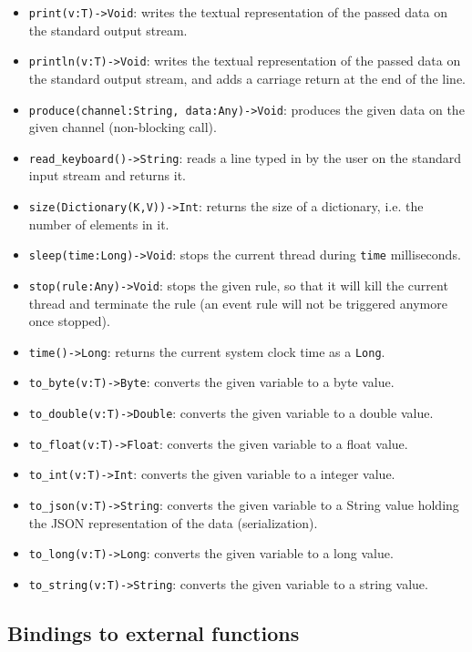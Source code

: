 \documentclass[11pt]{report}
\begin{document}
\begin{itemize}
\item \texttt{print(v:T)->Void}: writes the textual representation of the passed data on the standard output stream.
\item \texttt{println(v:T)->Void}: writes the textual representation of the passed data on the standard output stream, and adds a carriage return at the end of the line.
\item \texttt{produce(channel:String, data:Any)->Void}: produces the given data on the given channel (non-blocking call).
\item \texttt{read\_keyboard()->String}: reads a line typed in by the user on the standard input stream and returns it.
\item \texttt{size(Dictionary(K,V))->Int}: returns the size of a dictionary, i.e. the number of elements in it.
\item \texttt{sleep(time:Long)->Void}: stops the current thread during \texttt{time} milliseconds.
\item \texttt{stop(rule:Any)->Void}: stops the given rule, so that it will kill the current thread and terminate the rule (an event rule will not be triggered anymore once stopped).
\item \texttt{time()->Long}: returns the current system clock time as a \texttt{Long}.
\item \texttt{to\_byte(v:T)->Byte}: converts the given variable to a byte value.
\item \texttt{to\_double(v:T)->Double}: converts the given variable to a double value.
\item \texttt{to\_float(v:T)->Float}: converts the given variable to a float value.
\item \texttt{to\_int(v:T)->Int}: converts the given variable to a integer value.
\item \texttt{to\_json(v:T)->String}: converts the given variable to a String value holding the JSON representation of the data (serialization).
\item \texttt{to\_long(v:T)->Long}: converts the given variable to a long value.
\item \texttt{to\_string(v:T)->String}: converts the given variable to a string value.
\end{itemize}

\subsection{Bindings to external functions\label{sec:bindings}}
\end{document}
